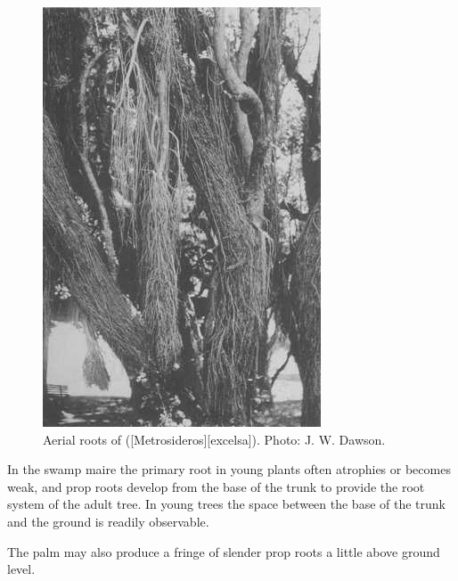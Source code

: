 \begin{figure}[htb]
\begin{minipage}[t]{0.302\textwidth}
    	\includegraphics[width=\textwidth]{graphics/figure15pohutakawa.jpg}
    	\caption[Aerial roots of pohutukawa]{Aerial roots of  ([Metrosideros][excelsa]).
    	Photo:  J. W. Dawson.}%
    	\label{fig:15pohutakawa}
	\end{minipage}
\end{figure}

In the swamp maire the primary root in young plants often atrophies or becomes weak, and prop roots develop from the base of the trunk to provide the root system of the adult tree.
In young trees the space between the base of the trunk and the ground is readily observable.

The  palm may also produce a fringe of slender prop roots a little above ground level.

